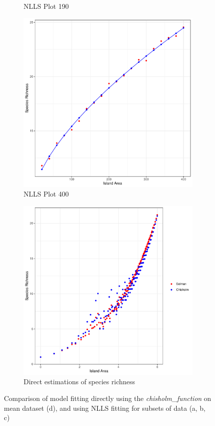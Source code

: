 \documentclass{article}
\begin{document}
\begin{figure}[h!]
\begin{subfigure}[b]{0.3\linewidth}
    \caption{NLLS Plot 190}
  \end{subfigure}
  \begin{subfigure}[b]{0.3\linewidth}
    \includegraphics[width=\linewidth]{../../Results/Simulation/NLLS/Plot_400.pdf}
    \caption{NLLS Plot 400}
  \end{subfigure}
  \begin{subfigure}[b]{0.5\linewidth}
    \includegraphics[width=\linewidth]{../../Results/Simulation/MeanResultsPlot.pdf}
    \caption{Direct estimations of species richness}
  \end{subfigure}
  \caption{Comparison of model fitting directly using the \textit{chisholm\_function} on mean dataset (d), and using NLLS fitting for subsets of data (a, b, c)}
  \label{fig:fitting}
\end{figure}

  
\end{document}
